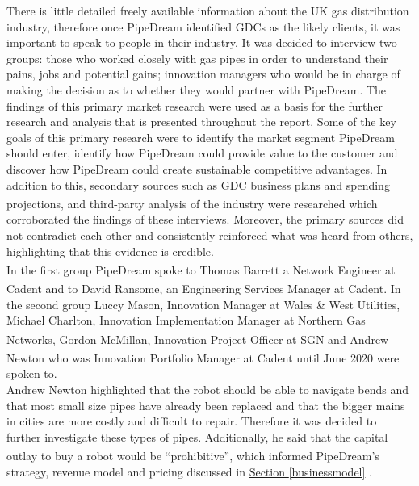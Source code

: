 \documentclass[11pt]{article}		%
\newcommand{\supercite}[1]{\textsuperscript{\cite{#1}}}		%
\newcommand{\sectref}[1]{\hyperref[#1]{Section \ref*{#1}}}     %
\begin{document}
            There is little detailed freely available information about the UK gas distribution industry, therefore once PipeDream identified GDCs as the likely clients, it was important to speak to people in their industry. It was decided to interview two groups: those who worked closely with gas pipes in order to understand their pains, jobs and potential gains; innovation managers who would be in charge of making the decision as to whether they would partner with PipeDream. The findings of this primary market research were used as a basis for the further research and analysis that is presented throughout the report. Some of the key goals of this primary research were to identify the market segment PipeDream should enter, identify how PipeDream could provide value to the customer and discover how PipeDream could create sustainable competitive advantages. In addition to this, secondary sources such as GDC business plans and spending projections\supercite{SGN-GD2}, and third-party analysis of the industry\supercite{Gas_Distribution_Industry} were researched which corroborated the findings of these interviews. Moreover, the primary sources did not contradict each other and consistently reinforced what was heard from others, highlighting that this evidence is credible.
	        \\
            \hspace*{3ex}In the first group PipeDream spoke to Thomas Barrett\supercite{Barret} a Network Engineer at Cadent and to David Ransome,\supercite{Ransome} an Engineering Services Manager at Cadent. In the second group Luccy Mason, Innovation Manager at Wales \& West Utilities, Michael Charlton, Innovation Implementation Manager at Northern Gas Networks, Gordon McMillan\supercite{McMillan}, Innovation Project Officer at SGN and Andrew Newton\supercite{Newton} who was Innovation Portfolio Manager at Cadent until June 2020 were spoken to.
	        \\
            \hspace*{3ex}Andrew Newton highlighted that the robot should be able to navigate bends and that most small size pipes have already been replaced and that the bigger mains in cities are more costly and difficult to repair. Therefore it was decided to further investigate these types of pipes. Additionally, he said that the capital outlay to buy a robot would be “prohibitive”\supercite{Newton}, which informed PipeDream's strategy, revenue model and pricing discussed in \sectref{businessmodel} .%
	        \\
\end{document}
